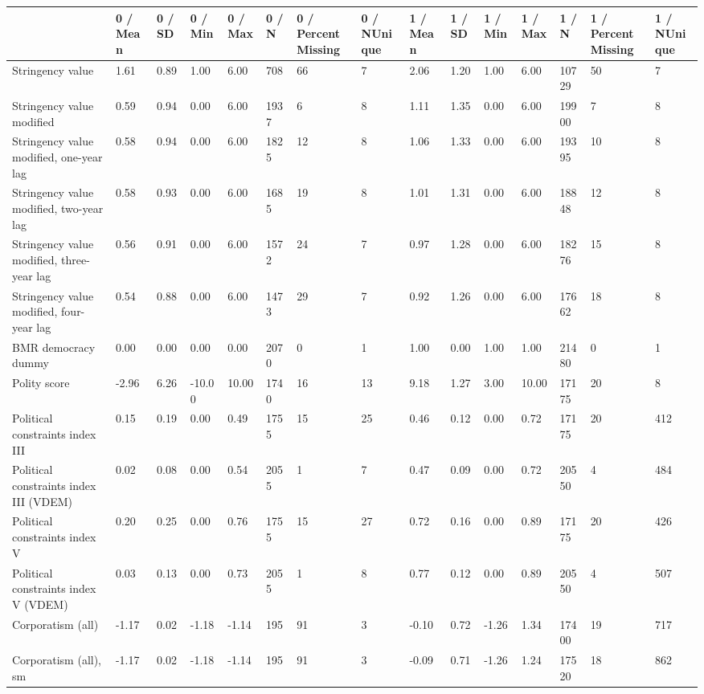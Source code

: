 
\begin{longtable}{lllllllllllllll}
\toprule
  & 0 / Mean & 0 / SD & 0 / Min & 0 / Max & 0 / N & 0 / PercentMissing & 0 / NUnique & 1 / Mean & 1 / SD & 1 / Min & 1 / Max & 1 / N & 1 / PercentMissing & 1 / NUnique\\
\midrule
Stringency value & 1.61 & 0.89 & 1.00 & 6.00 & 708 & 66 & 7 & 2.06 & 1.20 & 1.00 & 6.00 & 10729 & 50 & 7\\
Stringency value modified & 0.59 & 0.94 & 0.00 & 6.00 & 1937 & 6 & 8 & 1.11 & 1.35 & 0.00 & 6.00 & 19900 & 7 & 8\\
Stringency value modified, one-year lag & 0.58 & 0.94 & 0.00 & 6.00 & 1825 & 12 & 8 & 1.06 & 1.33 & 0.00 & 6.00 & 19395 & 10 & 8\\
Stringency value modified, two-year lag & 0.58 & 0.93 & 0.00 & 6.00 & 1685 & 19 & 8 & 1.01 & 1.31 & 0.00 & 6.00 & 18848 & 12 & 8\\
Stringency value modified, three-year lag & 0.56 & 0.91 & 0.00 & 6.00 & 1572 & 24 & 7 & 0.97 & 1.28 & 0.00 & 6.00 & 18276 & 15 & 8\\
\addlinespace
Stringency value modified, four-year lag & 0.54 & 0.88 & 0.00 & 6.00 & 1473 & 29 & 7 & 0.92 & 1.26 & 0.00 & 6.00 & 17662 & 18 & 8\\
BMR democracy dummy & 0.00 & 0.00 & 0.00 & 0.00 & 2070 & 0 & 1 & 1.00 & 0.00 & 1.00 & 1.00 & 21480 & 0 & 1\\
Polity score & -2.96 & 6.26 & -10.00 & 10.00 & 1740 & 16 & 13 & 9.18 & 1.27 & 3.00 & 10.00 & 17175 & 20 & 8\\
Political constraints index III & 0.15 & 0.19 & 0.00 & 0.49 & 1755 & 15 & 25 & 0.46 & 0.12 & 0.00 & 0.72 & 17175 & 20 & 412\\
Political constraints index III (VDEM) & 0.02 & 0.08 & 0.00 & 0.54 & 2055 & 1 & 7 & 0.47 & 0.09 & 0.00 & 0.72 & 20550 & 4 & 484\\
\addlinespace
Political constraints index V & 0.20 & 0.25 & 0.00 & 0.76 & 1755 & 15 & 27 & 0.72 & 0.16 & 0.00 & 0.89 & 17175 & 20 & 426\\
Political constraints index V (VDEM) & 0.03 & 0.13 & 0.00 & 0.73 & 2055 & 1 & 8 & 0.77 & 0.12 & 0.00 & 0.89 & 20550 & 4 & 507\\
Corporatism (all) & -1.17 & 0.02 & -1.18 & -1.14 & 195 & 91 & 3 & -0.10 & 0.72 & -1.26 & 1.34 & 17400 & 19 & 717\\
Corporatism (all), sm & -1.17 & 0.02 & -1.18 & -1.14 & 195 & 91 & 3 & -0.09 & 0.71 & -1.26 & 1.24 & 17520 & 18 & 862\\

\end{longtable}
